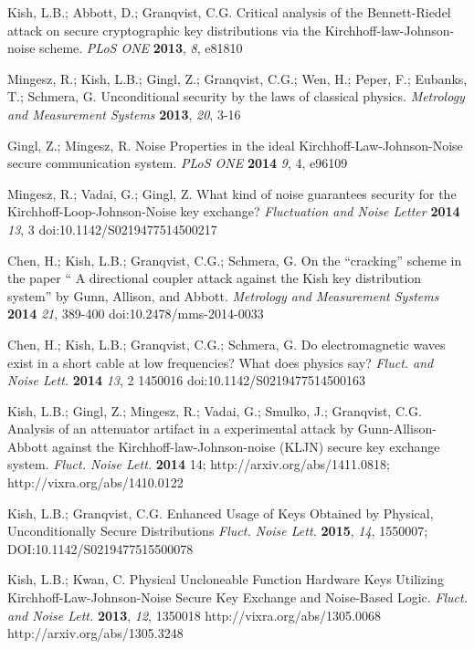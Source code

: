 \documentclass{ws-fnl2}
\begin{document}
\begin{thebibliography}{99}
Kish, L.B.; Abbott, D.; Granqvist, C.G. Critical analysis of the Bennett-Riedel attack on secure cryptographic key distributions via the Kirchhoff-law-Johnson-noise scheme. {\em PLoS ONE} {\bf 2013}, {\em 8}, e81810


Mingesz, R.; Kish, L.B.; Gingl, Z.; Granqvist, C.G.; Wen, H.; Peper, F.; Eubanks, T.; Schmera, G. Unconditional security by the laws of classical physics. {\em Metrology and Measurement Systems} {\bf 2013}, {\em 20}, 3-16

Gingl, Z.; Mingesz, R. Noise Properties in the ideal Kirchhoff-Law-Johnson-Noise secure communication system. {\em PLoS ONE} {\bf 2014} {\em 9}, 4, e96109

Mingesz, R.; Vadai, G.; Gingl, Z. What kind of noise guarantees security for the Kirchhoff-Loop-Johnson-Noise key exchange? {\em Fluctuation and Noise Letter} {\bf 2014} {\em 13}, 3 doi:10.1142/S0219477514500217

Chen, H.; Kish, L.B.; Granqvist, C.G.; Schmera, G. On the ``cracking'' scheme in the paper `` A directional coupler attack against the Kish key distribution system'' by Gunn, Allison, and Abbott. {\em Metrology and Measurement Systems} {\bf 2014} {\em 21}, 389-400 doi:10.2478/mms-2014-0033

Chen, H.; Kish, L.B.; Granqvist, C.G.; Schmera, G. Do electromagnetic waves exist in a short cable at low frequencies? What does physics say? {\em Fluct. and Noise Lett.} {\bf 2014} {\em 13}, 2 1450016 doi:10.1142/S0219477514500163

Kish, L.B.; Gingl, Z.; Mingesz, R.; Vadai, G.; Smulko, J.; Granqvist, C.G. Analysis of an attenuator artifact in a experimental attack by Gunn-Allison-Abbott against the Kirchhoff-law-Johnson-noise (KLJN) secure key exchange system. {\em Fluct. Noise Lett.} {\bf 2014} 14; http://arxiv.org/abs/1411.0818; http://vixra.org/abs/1410.0122

Kish, L.B.; Granqvist, C.G. Enhanced Usage of Keys Obtained by Physical, Unconditionally Secure Distributions {\em Fluct. Noise Lett.} {\bf 2015}, {\em 14}, 1550007; DOI:10.1142/S0219477515500078 

Kish, L.B.; Kwan, C. Physical Uncloneable Function Hardware Keys Utilizing Kirchhoff-Law-Johnson-Noise Secure Key Exchange and Noise-Based Logic. {\em Fluct. and Noise Lett.} {\bf 2013}, {\em 12}, 1350018 http://vixra.org/abs/1305.0068 http://arxiv.org/abs/1305.3248



\end{thebibliography}
\end{document}
